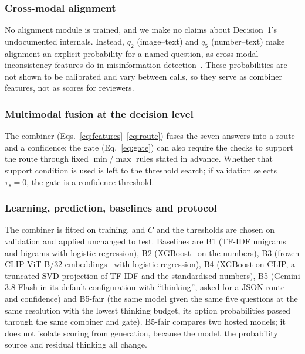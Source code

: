 \subsubsection{Cross-modal alignment}\label{sec:alignment}

No alignment module is trained, and we make no claims about Decision~1's undocumented internals. Instead, $q_2$ (image--text) and $q_5$ (number--text) make alignment an explicit probability for a named question, as cross-modal inconsistency features do in misinformation detection~\cite{akhtar2026}. These probabilities are not shown to be calibrated and vary between calls, so they serve as combiner features, not as scores for reviewers.

\subsubsection{Multimodal fusion at the decision level}\label{sec:fusion}

The combiner (Eqs.~\ref{eq:features}--\ref{eq:route}) fuses the seven answers into a route and a confidence; the gate (Eq.~\ref{eq:gate}) can also require the checks to support the route through fixed $\min$/$\max$ rules stated in advance. Whether that support condition is used is left to the threshold search; if validation selects $\tau_s=0$, the gate is a confidence threshold.

\subsubsection{Learning, prediction, baselines and protocol}\label{sec:learning}

The combiner is fitted on training, and $C$ and the thresholds are chosen on validation and applied unchanged to test. Baselines are B1 (TF-IDF unigrams and bigrams with logistic regression), B2 (XGBoost~\cite{chen2016xgboost} on the numbers), B3 (frozen CLIP ViT-B/32 embeddings~\cite{radford2021clip} with logistic regression), B4 (XGBoost on CLIP, a truncated-SVD projection of TF-IDF and the standardised numbers), B5 (Gemini 3.8 Flash in its default configuration with ``thinking'', asked for a JSON route and confidence) and B5-fair (the same model given the same five questions at the same resolution with the lowest thinking budget, its option probabilities passed through the same combiner and gate). B5-fair compares two hosted models; it does not isolate scoring from generation, because the model, the probability source and residual thinking all change.

